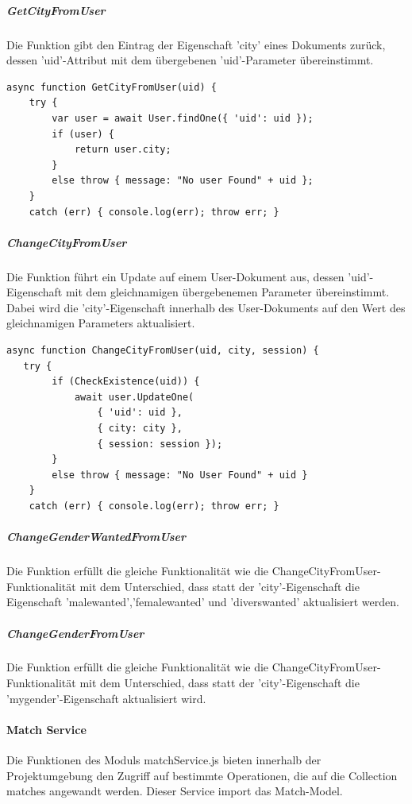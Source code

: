 \subparagraph{GetCityFromUser}
Die Funktion gibt den Eintrag der Eigenschaft 'city' eines Dokuments zurück, dessen 'uid'-Attribut mit dem übergebenen 'uid'-Parameter übereinstimmt.

\begin{lstlisting}[caption=User Service - CheckExistence, label=lst:userservicecheckexistence]
async function GetCityFromUser(uid) {
    try {
        var user = await User.findOne({ 'uid': uid });
        if (user) {
            return user.city;
        }
        else throw { message: "No user Found" + uid };
    }
    catch (err) { console.log(err); throw err; }
\end{lstlisting}

\subparagraph{ChangeCityFromUser}
Die Funktion führt ein Update auf einem User-Dokument aus, dessen 'uid'-Eigenschaft mit dem gleichnamigen übergebenemen Parameter übereinstimmt. Dabei wird die 'city'-Eigenschaft innerhalb des User-Dokuments auf den Wert des gleichnamigen Parameters aktualisiert.

\begin{lstlisting}[caption=User Service - ChangeCityFromUser, label=lst:userservicechangecityfromuser]
async function ChangeCityFromUser(uid, city, session) {  
   try {
        if (CheckExistence(uid)) {
            await user.UpdateOne(
                { 'uid': uid },
                { city: city },
                { session: session });
        }
        else throw { message: "No User Found" + uid }
    }
    catch (err) { console.log(err); throw err; }
\end{lstlisting}

\subparagraph{ChangeGenderWantedFromUser}
Die Funktion erfüllt die gleiche Funktionalität wie die ChangeCityFromUser-Funktionalität mit dem Unterschied, dass statt der 'city'-Eigenschaft die Eigenschaft 'malewanted','femalewanted' und 'diverswanted' aktualisiert werden.

\subparagraph{ChangeGenderFromUser}
Die Funktion erfüllt die gleiche Funktionalität wie die ChangeCityFromUser-Funktionalität mit dem Unterschied, dass statt der 'city'-Eigenschaft die 'mygender'-Eigenschaft aktualisiert wird.


%
%


\paragraph{Match Service}
Die Funktionen des Moduls matchService.js bieten innerhalb der Projektumgebung den Zugriff auf bestimmte Operationen, die auf die Collection matches angewandt werden. Dieser Service import das Match-Model.

